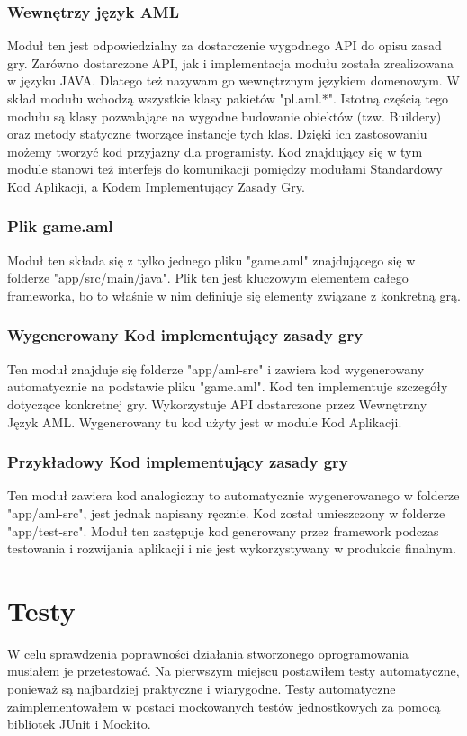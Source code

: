\documentclass	{xmgr}
\begin{document}
\subsection{Wewnętrzy język AML}
Moduł ten jest odpowiedzialny za dostarczenie wygodnego API do opisu zasad gry. Zarówno dostarczone API, jak i implementacja modułu została zrealizowana w języku JAVA. Dlatego też nazywam go wewnętrznym językiem domenowym. W skład modułu wchodzą wszystkie klasy pakietów "pl.aml.*".
Istotną częścią tego modułu są klasy pozwalające na wygodne budowanie obiektów (tzw. Buildery) oraz metody statyczne tworzące instancje tych klas. Dzięki ich zastosowaniu możemy tworzyć kod przyjazny dla programisty. Kod znajdujący się w tym module stanowi też interfejs do komunikacji pomiędzy modułami Standardowy Kod Aplikacji, a Kodem Implementujący Zasady Gry.

\subsection{Plik game.aml}
Moduł ten składa się z tylko jednego pliku "game.aml" znajdującego się w folderze "app/src/main/java". Plik ten jest kluczowym elementem całego frameworka, bo to właśnie w nim definiuje się elementy związane z konkretną grą.

\subsection{Wygenerowany Kod implementujący zasady gry}
Ten moduł znajduje się folderze "app/aml-src" i zawiera kod wygenerowany automatycznie na podstawie pliku "game.aml". Kod ten implementuje szczegóły dotyczące konkretnej gry. Wykorzystuje API dostarczone przez Wewnętrzny Język AML. Wygenerowany tu kod użyty jest w module Kod Aplikacji.

\subsection{Przykładowy Kod implementujący zasady gry}
Ten moduł zawiera kod analogiczny to automatycznie wygenerowanego w folderze "app/aml-src", jest jednak napisany ręcznie. Kod został umieszczony w folderze "app/test-src". Moduł ten zastępuje kod generowany przez framework podczas testowania i rozwijania aplikacji i nie jest wykorzystywany w produkcie finalnym.

\chapter{Testy} 
W celu sprawdzenia poprawności działania stworzonego oprogramowania musiałem je przetestować. Na pierwszym miejscu postawiłem testy automatyczne, ponieważ są najbardziej praktyczne i wiarygodne. Testy automatyczne zaimplementowałem w postaci mockowanych testów jednostkowych za pomocą bibliotek JUnit i Mockito.
\end{document}
